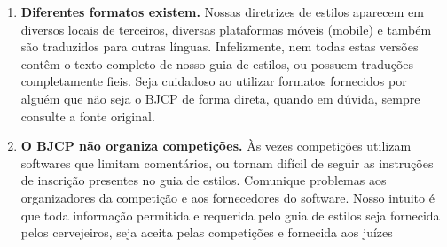 \begin{enumerate}
\item \textbf{Diferentes formatos existem.} Nossas diretrizes de estilos aparecem em diversos locais de terceiros, diversas plataformas móveis (mobile) e também são traduzidos para outras línguas. Infelizmente, nem todas estas versões contêm o texto completo de nosso guia de estilos, ou possuem traduções completamente fieis. Seja cuidadoso ao utilizar formatos fornecidos por alguém que não seja o BJCP de forma direta, quando em dúvida, sempre consulte a fonte original.
\item \textbf{O BJCP não organiza competições.} Às vezes competições utilizam softwares que limitam comentários, ou tornam difícil de seguir as instruções de inscrição presentes no guia de estilos. Comunique problemas aos organizadores da competição e aos fornecedores do software. Nosso intuito é que toda informação permitida e requerida pelo guia de estilos seja fornecida pelos cervejeiros, seja aceita pelas competições e fornecida aos juízes
\end{enumerate}